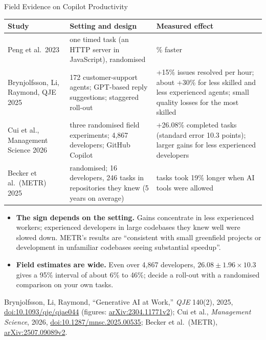 \begin{frame}{Field Evidence on Copilot Productivity}
  {\centering\scriptsize
  \begin{tabular}{>{\raggedright\arraybackslash}p{2.4cm} >{\raggedright\arraybackslash}p{4.0cm} >{\raggedright\arraybackslash}p{5.6cm}}
    \toprule
    \textbf{Study} & \textbf{Setting and design} & \textbf{Measured effect} \\
    \midrule
    Peng et al.\ 2023 & one timed task (an HTTP server in JavaScript), randomised & 55.8\% faster \\
    \addlinespace[0.2em]
    Brynjolfsson, Li, Raymond, QJE 2025 & 5{,}172 customer-support agents; GPT-based reply suggestions; staggered roll-out & +15\% issues resolved per hour; about +30\% for less skilled and less experienced agents; small quality losses for the most skilled \\
    \addlinespace[0.2em]
    Cui et al., Management Science 2026 & three randomised field experiments; 4{,}867 developers; GitHub Copilot & +26.08\% completed tasks (standard error 10.3 points); larger gains for less experienced developers \\
    \addlinespace[0.2em]
    Becker et al.\ (METR) 2025 & randomised; 16 developers, 246 tasks in repositories they knew (5 years on average) & tasks took 19\% longer when AI tools were allowed \\
    \bottomrule
  \end{tabular}\par}
  \vspace{0.4em}
  \begin{itemize}\scriptsize\itemsep0.3em
    \item[\textcolor{red}{$\blacktriangleright$}] \textbf{The sign depends on the setting.} Gains concentrate in less experienced workers; experienced developers in large codebases they knew well were slowed down. METR's results are ``consistent with small greenfield projects or development in unfamiliar codebases seeing substantial speedup''.
    \item[\textcolor{red}{$\blacktriangleright$}] \textbf{Field estimates are wide.} Even over 4{,}867 developers, $26.08 \pm 1.96 \times 10.3$ gives a 95\% interval of about 6\% to 46\%; decide a roll-out with a randomised comparison on your own tasks.
  \end{itemize}
  \vspace{0.1em}
  {\scriptsize Brynjolfsson, Li, Raymond, ``Generative AI at Work,'' \textit{QJE} 140(2), 2025, \href{https://doi.org/10.1093/qje/qjae044}{doi:10.1093/qje/qjae044} (figures: \href{https://arxiv.org/abs/2304.11771v2}{arXiv:2304.11771v2}); Cui et al., \textit{Management Science}, 2026, \href{https://doi.org/10.1287/mnsc.2025.00535}{doi:10.1287/mnsc.2025.00535}; Becker et al.\ (METR), \href{https://arxiv.org/abs/2507.09089v2}{arXiv:2507.09089v2}.\par}
\end{frame}

